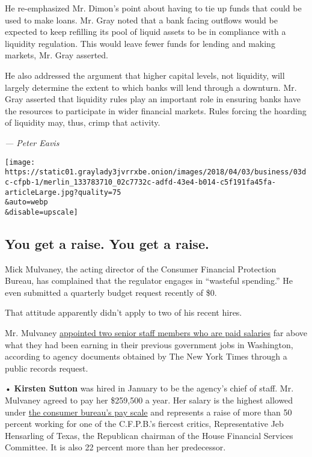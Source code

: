 He re-emphasized Mr. Dimon's point about having to tie up funds that
could be used to make loans. Mr. Gray noted that a bank facing outflows
would be expected to keep refilling its pool of liquid assets to be in
compliance with a liquidity regulation. This would leave fewer funds for
lending and making markets, Mr. Gray asserted.

He also addressed the argument that higher capital levels, not
liquidity, will largely determine the extent to which banks will lend
through a downturn. Mr. Gray asserted that liquidity rules play an
important role in ensuring banks have the resources to participate in
wider financial markets. Rules forcing the hoarding of liquidity may,
thus, crimp that activity.

\emph{--- Peter Eavis}

\texttt{[image: https://static01.graylady3jvrrxbe.onion/images/2018/04/03/business/03dc-cfpb-1/merlin\_133783710\_02c7732c-adfd-43e4-b014-c5f191fa45fa-articleLarge.jpg?quality=75\\\&auto=webp\\\&disable=upscale]}

\hypertarget{you-get-a-raise-you-get-a-raise}{%
\subsection{You get a raise. You get a
raise.}\label{you-get-a-raise-you-get-a-raise}}

Mick Mulvaney, the acting director of the Consumer Financial Protection
Bureau, has complained that the regulator engages in ``wasteful
spending.'' He even submitted a quarterly budget request recently of
\$0.

That attitude apparently didn't apply to two of his recent hires.

Mr. Mulvaney
\href{https://www.nytimes3xbfgragh.onion/2018/04/05/business/cfpb-mick-mulvaney-pay-raises.html}{appointed
two senior staff members who are paid salaries} far above what they had
been earning in their previous government jobs in Washington, according
to agency documents obtained by The New York Times through a public
records request.

• \textbf{Kirsten Sutton} was hired in January to be the agency's chief
of staff. Mr. Mulvaney agreed to pay her \$259,500 a year. Her salary is
the highest allowed under
\href{https://files.consumerfinance.gov/f/documents/cfpb_pay_scales.pdf}{the
consumer bureau's pay scale} and represents a raise of more than 50
percent working for one of the C.F.P.B.'s fiercest critics,
Representative Jeb Hensarling of Texas, the Republican chairman of the
House Financial Services Committee. It is also 22 percent more than her
predecessor.

